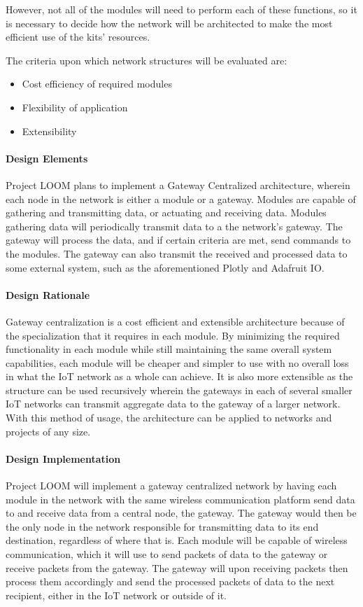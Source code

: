 \documentclass[onecolumn, draftclsnofoot,10pt, compsoc]{IEEEtran}
\begin{document}
    However, not all of the modules will need to perform each of these functions, so it is necessary to decide how the network will be architected to make the most efficient use of the kits' resources. 

    The criteria upon which network structures will be evaluated are: 
    \begin{itemize}[noitemsep,topsep=-10pt]
        \item Cost efficiency of required modules
        \item Flexibility of application
        \item Extensibility
    \end{itemize}

\paragraph{Design Elements}
    Project LOOM plans to implement a Gateway Centralized architecture, wherein each node in the network is either a module or a gateway. Modules are capable of gathering and transmitting data, or actuating and receiving data. Modules gathering data will periodically transmit data to a the network's gateway. The gateway will process the data, and if certain criteria are met, send commands to the modules. The gateway can also transmit the received and processed data to some external system, such as the aforementioned Plotly and Adafruit IO. 

\paragraph{Design Rationale}
    Gateway centralization is a cost efficient and extensible architecture because of the specialization that it requires in each module. By minimizing the required functionality in each module while still maintaining the same overall system capabilities, each module will be cheaper and simpler to use with no overall loss in what the IoT network as a whole can achieve. It is also more extensible as the structure can be used recursively wherein the gateways in each of several smaller IoT networks can transmit aggregate data to the gateway of a larger network. With this method of usage, the architecture can be applied to networks and projects of any size.

\paragraph{Design Implementation}
    Project LOOM will implement a gateway centralized network by having each module in the network with the same wireless communication platform send data to and receive data from a central node, the gateway. The gateway would then be the only node in the network responsible for transmitting data to its end destination, regardless of where that is. Each module will be capable of wireless communication, which it will use to send packets of data to the gateway or receive packets from the gateway. The gateway will upon receiving packets then process them accordingly and send the processed packets of data to the next recipient, either in the IoT network or outside of it. 
\end{document}

